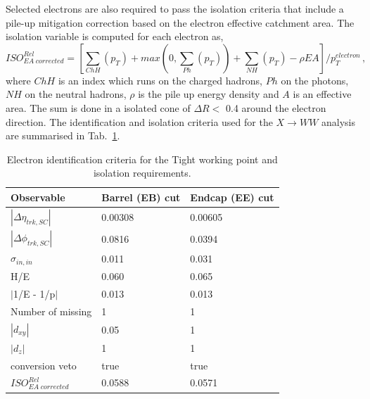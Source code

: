 Selected electrons are also required to pass the isolation criteria that include a pile-up mitigation correction based on the electron effective 
catchment area. The isolation variable is computed for each electron as,
\begin{equation}
ISO^{Rel}_{EA\; corrected}=[\sum_{ChH}(p_T) + max(0, \sum_{Ph}(p_T)) +\sum_{NH}(p_T)  -\rho EA ]/p_T^{electron} \, ,
\end{equation}
where $ChH$ is an index which runs on the charged hadrons, $Ph$ on the photons, $NH$ on the neutral hadrons, $\rho$ is the pile up energy
density and $A$ is an effective area. The sum is done in a isolated cone of $\Delta R<$ 0.4 around the electron direction.
The identification and isolation criteria used for the $X \to WW$ analysis are summarised in Tab.~\ref{IDe}.

\begin{table}
\centering
\begin{tabular}{|lll|}
\hline
Observable & Barrel (EB) cut &Endcap (EE) cut\\
\hline
$|\Delta \eta_{trk,SC}|$  &0.00308  & 0.00605 \\
$|\Delta \phi_{trk,SC}|$ & 0.0816   &0.0394\\
$\sigma_{in,in}$ &0.011& 0.031\\
H/E & 0.060& 0.065\\
$|$1/E - 1/p$|$ & 0.013 &0.013\\
Number of missing &1&1\\
$|d_{xy}|$ &0.05&1\\
$|d_z|$ &1&1\\
conversion veto& true&true\\ 
\hline
$ISO^{Rel}_{EA\; corrected}$&0.0588 & 0.0571\\
\hline

\end{tabular}
\caption{Electron identification criteria for the Tight working point and isolation requirements.}
\label{IDe}
\end{table}

